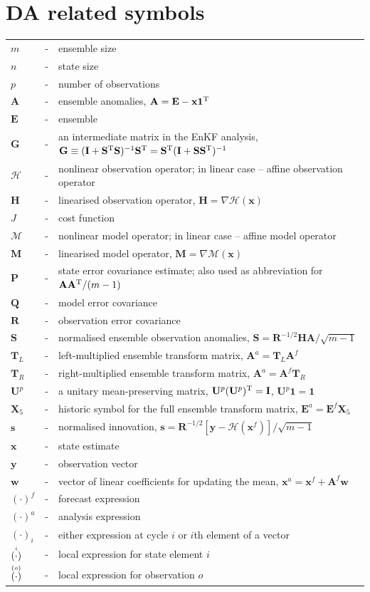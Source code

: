 \documentclass[11pt]{report}
\newcommand{\mb} {\mathbf}
\newcommand{\T}{^{\tiny \mathrm T}}
\newcommand{\ac}{\accentset}
\begin{document}
\section*{DA related symbols}
\begin{tabular}{lll}
  $m$ &-& ensemble size \\
  $n$ &-& state size \\
  $p$ &-& number of observations \\
  $\mb A$ &-& ensemble anomalies, $\mb A = \mb E - \mb x \mb 1\T$ \\
  $\mb E$ &-& ensemble \\
  $\mb G$ &-& an intermediate matrix in the EnKF analysis, $\mb G \equiv (\mb I + \mb S\T \mb S)^{-1} \mb S\T = \mb S\T ( \mb I + \mb S \mb S\T)^{-1}$ \\
  $\mathcal H$ &-& nonlinear observation operator; in linear case -- affine observation operator \\
  $\mb H$ &-& linearised observation operator, $\mb H = \nabla \mathcal H(\mb x)$ \\
  $J$ &-& cost function \\
  $\mathcal M$ &-& nonlinear model operator; in linear case -- affine model operator \\
  $\mb M$ &-& linearised model operator, $\mb M = \nabla \mathcal M(\mb x)$ \\
  $\mb P$ &-& state error covariance estimate; also used as abbreviation for $\mb A \mb A\T / (m - 1)$ \\
  $\mb Q$ &-& model error covariance \\
  $\mb R$ &-& observation error covariance \\
  $\mb S$ &-& normalised ensemble observation anomalies, $\mb S = \mb R^{-1/2} \mb {HA} / \sqrt{m - 1}$ \\
  $\mb T_L$ &-& left-multiplied ensemble transform matrix, $\mb A^a = \mb T_L \mb A^f$ \\
  $\mb T_R$ &-& right-multiplied ensemble transform matrix, $\mb A^a = \mb A^f \mb T_R$ \\
  $\mb U^p$ &-& a unitary mean-preserving matrix, $\mb U^p (\mb U^p) \T = \mb I$, $\mb U^p \mb 1 = \mb 1$ \\
  $\mb X_5$ &-& historic symbol for the full ensemble transform matrix, $\mb E^a = \mb E^f \mb X_5$ \\ 
  $\mb s$ &-& normalised innovation, $\mb s = \mb R^{-1/2} \left[ \mb y - \mathcal H (\mb x^f) \right] / \sqrt{m - 1}$ \\
  $\mb x$ &-& state estimate \\
  $\mb y$ &-& observation vector \\
  $\mb w$ &-& vector of linear coefficients for updating the mean, $\mb x^a = \mb x^f + \mb A^f \mb w$ \\
  $(\cdot)^f$ &-& forecast expression \\
  $(\cdot)^a$ &-& analysis expression \\
  $(\cdot)_i$ &-& either expression at cycle $i$ or $i$th element of a vector \\
  $\ac{i}{(\cdot)}$ &-& local expression for state element $i$ \\
  $\ac{\{o\}}{(\cdot)}$ &-& local expression for observation $o$
\end{tabular}
\end{document}
